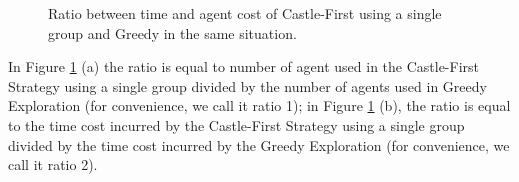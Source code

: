 \begin{figure} [H]
  \centering 
    \hspace{1in} 
    \hspace{1in} 
    \caption{Ratio between   time and   agent cost of {\sc Castle-First}  using a single   group and 
     {\sc Greedy} in the same situation.} 
  \label{fig:C_AT} %
\end{figure}      
In Figure \ref{fig:C_AT}  (a)   the ratio is equal to number of agent used in the {\sc Castle-First} Strategy using a single group divided by the number of agents used in {\sc Greedy} Exploration 
(for convenience, we call it   ratio 1);    in Figure \ref{fig:C_AT}  (b), the ratio is equal to the time cost incurred by the  {\sc Castle-First} Strategy using a single group  divided by the time cost incurred by the {\sc Greedy} Exploration 
(for convenience, we call it  ratio 2).

